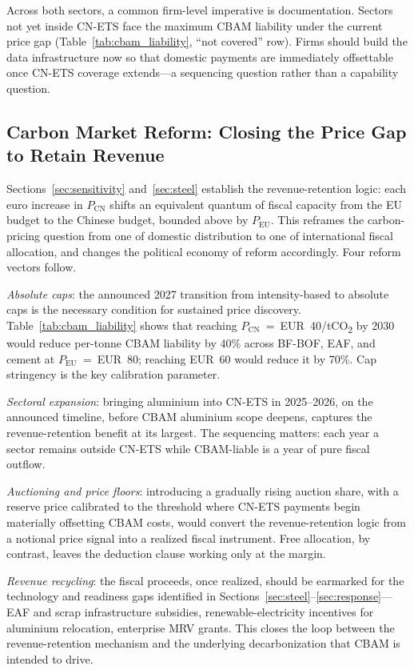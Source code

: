 \documentclass[letterpaper, 10pt, conference]{ieeeconf}
\begin{document}
Across both sectors, a common firm-level imperative is documentation.
Sectors not yet inside CN-ETS face the maximum CBAM liability under
the current price gap (Table~\ref{tab:cbam_liability}, ``not covered''
row). Firms should build the data infrastructure now so that domestic
payments are immediately offsettable once CN-ETS coverage extends---a
sequencing question rather than a capability question.

\subsection{Carbon Market Reform: Closing the Price Gap to Retain Revenue}
\label{sec:reform}

Sections~\ref{sec:sensitivity} and~\ref{sec:steel} establish the
revenue-retention logic: each euro increase in $P_{\mathrm{CN}}$
shifts an equivalent quantum of fiscal capacity from the EU budget to
the Chinese budget, bounded above by $P_{\mathrm{EU}}$. This
reframes the carbon-pricing question from one of domestic distribution
to one of international fiscal allocation, and changes the political
economy of reform accordingly. Four reform vectors follow.

\emph{Absolute caps}: the announced 2027 transition from
intensity-based to absolute caps is the necessary condition for
sustained price discovery. Table~\ref{tab:cbam_liability} shows that
reaching $P_{\mathrm{CN}}$~=~EUR~40/tCO\textsubscript{2} by 2030
would reduce per-tonne CBAM liability by 40\% across BF-BOF, EAF,
and cement at $P_{\mathrm{EU}}$~=~EUR~80; reaching EUR~60 would
reduce it by 70\%. Cap stringency is the key calibration parameter.

\emph{Sectoral expansion}: bringing aluminium into CN-ETS in
2025--2026, on the announced timeline, before CBAM aluminium scope
deepens, captures the revenue-retention benefit at its largest. The
sequencing matters: each year a sector remains outside CN-ETS while
CBAM-liable is a year of pure fiscal outflow.

\emph{Auctioning and price floors}: introducing a gradually rising
auction share, with a reserve price calibrated to the threshold where
CN-ETS payments begin materially offsetting CBAM costs, would convert
the revenue-retention logic from a notional price signal into a
realized fiscal instrument. Free allocation, by contrast, leaves the
deduction clause working only at the margin.

\emph{Revenue recycling}: the fiscal proceeds, once realized, should
be earmarked for the technology and readiness gaps identified in
Sections~\ref{sec:steel}--\ref{sec:response}---EAF and scrap
infrastructure subsidies, renewable-electricity incentives for
aluminium relocation, enterprise MRV grants. This closes the loop
between the revenue-retention mechanism and the underlying
decarbonization that CBAM is intended to drive.
\end{document}
